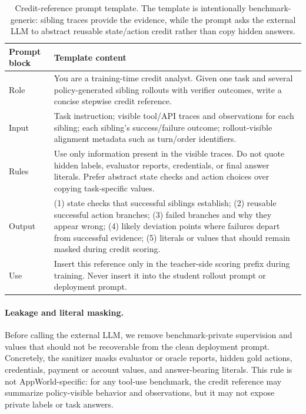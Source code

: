\begin{table}[t]
  \centering
  \venuecompacttablefont
  \setlength{\tabcolsep}{4pt}
  \begin{tabular}{p{}p{}}
    \hline
    \textbf{Prompt block} & \textbf{Template content} \\
    \hline
    Role &
    You are a training-time credit analyst. Given one task and several
    policy-generated sibling rollouts with verifier outcomes, write a concise
    stepwise credit reference. \\
    Input &
    Task instruction; visible tool/API traces and observations for each
    sibling; each sibling's success/failure outcome; rollout-visible alignment
    metadata such as turn/order identifiers. \\
    Rules &
    Use only information present in the visible traces. Do not quote hidden
    labels, evaluator reports, credentials, or final answer literals. Prefer
    abstract state checks and action choices over copying task-specific values. \\
    Output &
    (1) state checks that successful siblings establish; (2) reusable
    successful action branches; (3) failed branches and why they appear wrong;
    (4) likely deviation points where failures depart from successful evidence;
    (5) literals or values that should remain masked during credit scoring. \\
    Use &
    Insert this reference only in the teacher-side scoring prefix during
    training. Never insert it into the student rollout prompt or deployment
    prompt. \\
    \hline
  \end{tabular}
  \caption{Credit-reference prompt template. The template is intentionally
    benchmark-generic: sibling traces provide the evidence, while the prompt
    asks the external LLM to abstract reusable state/action credit rather than
    copy hidden answers.}
  \label{tab:credit_prompt}
\end{table}

\paragraph{Leakage and literal masking.} Before calling the external LLM, we
remove benchmark-private supervision and values that should not be recoverable
from the clean deployment prompt. Concretely, the sanitizer masks evaluator or
oracle reports, hidden gold actions, credentials, payment or account values,
and answer-bearing literals. This rule is not AppWorld-specific: for any
tool-use benchmark, the credit reference may summarize policy-visible behavior
and observations, but it may not expose private labels or task answers.

